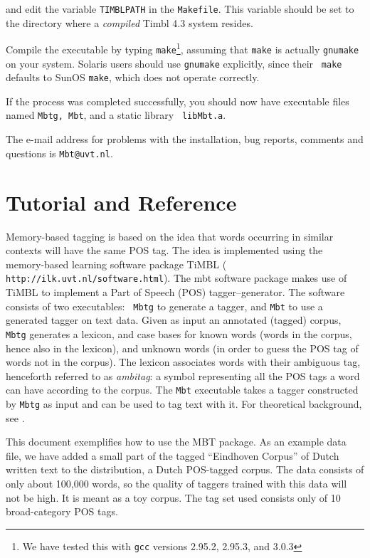 \documentclass{report}
\begin{document}
and edit the variable {\tt TIMBLPATH} in the {\tt Makefile}. This
variable should be set to the directory where a {\em compiled} Timbl
4.3 system resides.

Compile the executable by typing {\tt make}\footnote{We have
tested this with {\tt gcc} versions 2.95.2, 2.95.3, and 3.0.3},
assuming that {\tt make} is actually {\tt gnumake} on your system.
Solaris users should use {\tt gnumake} explicitly, since their {\tt
make} defaults to SunOS {\tt make}, which does not operate correctly.

If the process was completed successfully, you should now have
executable files named {\tt Mbtg, Mbt}, and a static library {\tt
libMbt.a}.

The e-mail address for problems with the installation, bug reports,
comments and questions is {\tt Mbt@uvt.nl}.

\chapter{Tutorial and Reference}
\label{tutorial}

Memory-based tagging is based on the idea that words occurring in
similar contexts will have the same POS tag. The idea is implemented
using the memory-based learning software package TiMBL ({\tt
http://ilk.uvt.nl/software.html}).  The {\sc mbt} software package
makes use of TiMBL to implement a Part of Speech (POS)
tagger--generator.  The software consists of two executables: {\tt
Mbtg} to generate a tagger, and {\tt Mbt} to use a generated tagger on
text data.  Given as input an annotated (tagged) corpus, {\tt Mbtg}
generates a lexicon, and case bases for known words (words in the
corpus, hence also in the lexicon), and unknown words (in order to
guess the POS tag of words not in the corpus). The lexicon associates
words with their ambiguous tag, henceforth referred to as {\em
ambitag}: a symbol representing all the POS tags a word can have
according to the corpus. The {\tt Mbt} executable takes a tagger
constructed by {\tt Mbtg} as input and can be used to tag text with
it.  For theoretical background, see \cite{Daelemans+96,Zavrel+99}.

This document exemplifies how to use the MBT package. As an example
data file, we have added a small part of the tagged ``Eindhoven
Corpus'' of Dutch written text \cite{Uitdenboogaard75} to the
distribution, a Dutch POS-tagged corpus. The data consists of only
about 100,000 words, so the quality of taggers trained with this data
will not be high. It is meant as a toy corpus. The tag set used
consists only of 10 broad-category POS tags.
\end{document}
